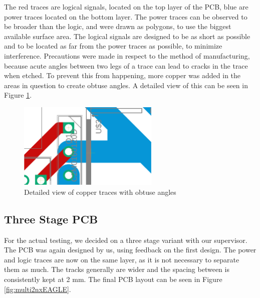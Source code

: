 The red traces are logical signals,
located on the top layer of the PCB,
blue are power traces located on the bottom layer.
The power traces can be observed to be broader than the logic,
and were drawn as polygons,
to use the biggest available surface area.
The logical signals are designed to be as short as possible
and to be located as far from the power traces as possible,
to minimize interference.
\clearpage
Precautions were made in respect to the method of manufacturing,
because acute angles between two legs of a trace can lead to cracks in the trace when etched.
To prevent this from happening,
more copper was added in the areas in question to create obtuse angles.
A detailed view of this can be seen in Figure \ref{fig:2nxeagledetail}.
\begin{figure}[H]
	\begin{center}
	\includegraphics[width=0.6\textwidth]{figures/05cPCBdesign/2NX_interleaved_boost_converter_EAGLE_BY_DANIEL_DETAIL.pdf}
	\end{center}
	\caption{Detailed view of copper traces with obtuse angles}
	\label{fig:2nxeagledetail}
\end{figure}

\subsection{Three Stage PCB}\label{sub:3sPCB}
For the actual testing,
we decided on a three stage variant with our supervisor.
The PCB was again designed by us,
using feedback on the first design.
The power and logic traces are now on the same layer,
as it is not necessary to separate them as much.
The tracks generally are wider
and the spacing between is consistently kept at 2 mm.
The final PCB layout can be seen in Figure \ref{fig:multi2nxEAGLE}.

